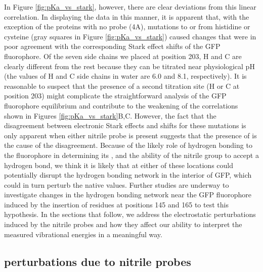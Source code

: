In Figure \ref{fig:pKa_vs_stark}, however, there are clear deviations from this linear correlation.
In displaying the data in this manner, it is apparent that, with the exception of the proteins with no \pCNF{} probe (4A), mutations to or from histidine or cysteine (gray squares in Figure \ref{fig:pKa_vs_stark}) caused \pKa{} changes that were in poor agreement with the corresponding Stark effect shifts of the GFP fluorophore.
Of the seven side chains we placed at position 203, H and C are clearly different from the rest because they can be titrated near physiological pH (the \pKa{} values of H and C side chains in water are 6.0 and 8.1, respectively).
It is reasonable to suspect that the presence of a second titration site (H or C at position 203) might complicate the straightforward analysis of the GFP fluorophore equilibrium and contribute to the weakening of the correlations shown in Figures \ref{fig:pKa_vs_stark}B,C.
However, the fact that the disagreement between electronic Stark effects and \pKa{} shifts for these mutations is only apparent when either nitrile probe is present suggests that the presence of \pCNF{} is the cause of the disagreement.
Because of the likely role of hydrogen bonding to the fluorophore in determining its \pKa{}, and the ability of the nitrile group to accept a hydrogen bond, we think it is likely that \pCNF{} at either of these locations could potentially disrupt the hydrogen bonding network in the interior of GFP, which could in turn perturb the native \pKa{} values.
Further studies are underway to investigate changes in the hydrogen bonding network near the GFP fluorophore induced by the insertion of \pCNF{} residues at positions 145 and 165 to test this hypothesis.
In the sections that follow, we address the electrostatic perturbations induced by the nitrile probes and how they affect our ability to interpret the measured vibrational energies in a meaningful way.

\subsection{\pKa{} perturbations due to nitrile probes}

